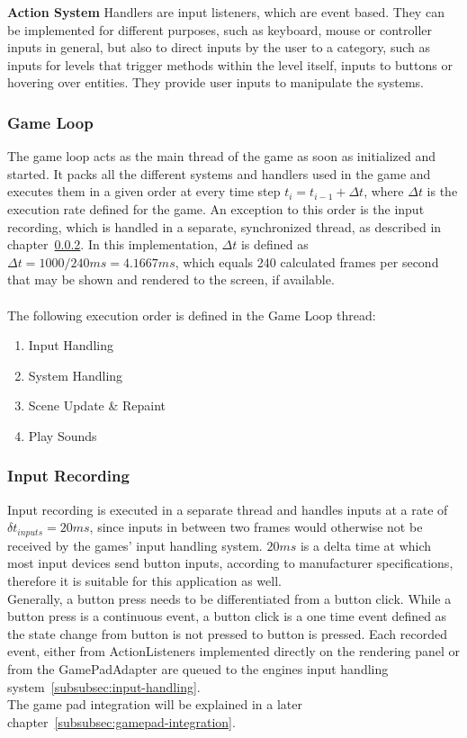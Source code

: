 \textbf{Action System}
Handlers are input listeners, which are event based.
They can be implemented for different purposes, such as keyboard, mouse or controller inputs in general, but also to direct inputs by the user
to a category, such as inputs for levels that trigger methods within the level itself, inputs to buttons or hovering over entities.
They provide user inputs to manipulate the systems. 

\subsubsection{Game Loop}\label{subsubsec:game-loop}
The game loop acts as the main thread of the game as soon as initialized and started.
It packs all the different systems and handlers used in the game and executes them in a given order at every time step
$t_{i} = t_{i-1} + \Delta t$, where $\Delta t$ is the execution rate defined for the game.
An exception to this order is the input recording, which is handled in a separate, synchronized thread, as described in chapter~\ref{subsubsec:input-recording}.
In this implementation, $\Delta t$ is defined as $\Delta t = 1000 / 240 ms = 4.1667 ms$, which equals 240 calculated frames per second that may be shown and rendered
to the screen, if available.
\\ \\
The following execution order is defined in the Game Loop thread:
\begin{enumerate}
    \item Input Handling
    \item System Handling
    \item Scene Update \& Repaint
    \item Play Sounds
\end{enumerate}

\subsubsection{Input Recording}\label{subsubsec:input-recording}
Input recording is executed in a separate thread and handles inputs at a rate of $\delta t_{inputs} = 20 ms$, since inputs in between two frames
would otherwise not be received by the games' input handling system.
$20 ms$ is a delta time at which most input devices send button inputs, according to manufacturer specifications, therefore it is suitable for this application as well. 
\\
Generally, a button press needs to be differentiated from a button click.
While a button press is a continuous event, a button click is a one time event defined as the state change from button is not pressed to button is pressed.
Each recorded event, either from ActionListeners implemented directly on the rendering panel or from the GamePadAdapter are queued to the engines input handling system~\ref{subsubsec:input-handling}.
\\
The game pad integration will be explained in a later chapter~\ref{subsubsec:gamepad-integration}.
